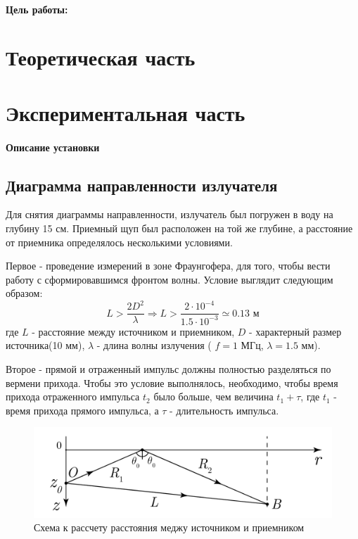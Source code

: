 

\def\labauthors{Виноградов И.Д., Шиков А.П.}
\def\labgroup{440}
\def\labnumber{1}
\def\labtheme{Исследование акустического поля в однородной среде с плоской границей}
\def\department{Кафедра акустики}
\newcommand{\D}[1]{D\qty[#1]}


\paragraph{Цель работы:}

\section{Теоретическая часть}

\newpage
\section{Экспериментальная часть}
\paragraph{Описание установки}

\subsection{Диаграмма направленности излучателя}
Для снятия диаграммы направленности, излучатель был погружен в воду на глубину 15 см. Приемный щуп был расположен на той
же глубине, а расстояние от приемника определялось несколькими условиями.

Первое - проведение измерений в зоне Фраунгофера, для того, чтобы вести работу с сформировавшимся фронтом волны. Условие
выглядит следующим образом:
\begin{equation}
	L > \frac{2D^2}{\lambda} \Rightarrow L > \frac{2 \cdot 10^{-4}}{1.5 \cdot 10^{-3}} \simeq 0.13 \text{ м} 
	\label{eq:exp:fraungofer}
\end{equation}
где $L$ - расстояние между источником и приемником, $D$ - характерный размер источника(10 мм), $\lambda$ - длина волны
излучения ( $f = 1$ МГц, $\lambda = 1.5$ мм). 

Второе - прямой и отраженный импульс должны полностью разделяться по вермени прихода. Чтобы это условие выполнялось,
необходимо, чтобы время прихода отраженного импульса $t_2$ было больше, чем величина $t_1+\tau$, где $t_1$ - время
прихода прямого импульса, а $\tau$ - длительность импульса.
\begin{figure}[h!]
	\centering
	\includegraphics[width =0.7\linewidth]{fig/scheme2.pdf}
	\caption{Схема к рассчету расстояния меджу источником и приемником}
	\label{fig:expt:scheme2}
\end{figure}


